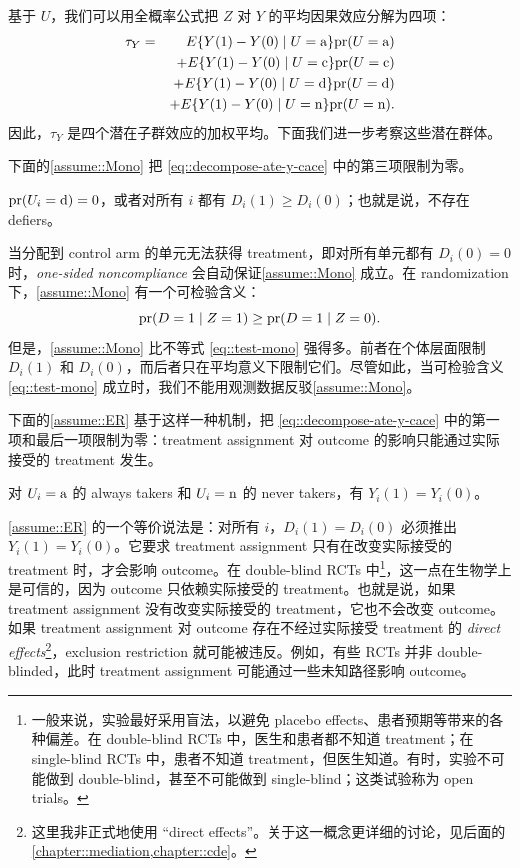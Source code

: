 基于 $U$，我们可以用全概率公式把 $Z$ 对 $Y$ 的平均因果效应分解为四项：
\begin{eqnarray} 
\tau_Y &=& E\{ Y(1) - Y(0) \mid U=\textup{a}  \} \textup{pr}(U = \textup{a} )  \nonumber  \\
&&+ E\{ Y(1) - Y(0) \mid U=\textup{c}   \} \textup{pr}(U = \textup{c} ) \nonumber  \\
&&+ E\{ Y(1) - Y(0) \mid U=\textup{d}  \} \textup{pr}(U = \textup{d} ) \nonumber  \\
&&+ E\{ Y(1) - Y(0) \mid U=\textup{n}  \} \textup{pr}(U = \textup{n} ) . \label{eq::decompose-ate-y-cace}
\end{eqnarray}  
因此，$\tau_Y $ 是四个潜在子群效应的加权平均。下面我们进一步考察这些潜在群体。



下面的\cref{assume::Mono} 把 \cref{eq::decompose-ate-y-cace} 中的第三项限制为零。
\begin{assumption}[monotonicity]
\label{assume::Mono}
$\textup{pr}(U_i = \textup{d}) = 0$，或者对所有 $i$ 都有 $D_i(1)\geq D_i(0)$；也就是说，不存在 defiers。
\end{assumption}

当分配到 control arm 的单元无法获得 treatment，即对所有单元都有 $D_i(0) = 0$ 时，{\it one-sided noncompliance} 会自动保证\cref{assume::Mono} 成立。在 randomization 下，\cref{assume::Mono} 有一个可检验含义：
\begin{equation}
\label{eq::test-mono}
\textup{pr}(D=1\mid Z=1) \geq \textup{pr}(D=1\mid Z=0).
\end{equation}
但是，\cref{assume::Mono} 比不等式 \cref{eq::test-mono} 强得多。前者在个体层面限制 $D_i(1)$ 和 $D_i(0)$，而后者只在平均意义下限制它们。尽管如此，当可检验含义 \cref{eq::test-mono} 成立时，我们不能用观测数据反驳\cref{assume::Mono}。


下面的\cref{assume::ER} 基于这样一种机制，把 \cref{eq::decompose-ate-y-cace} 中的第一项和最后一项限制为零：treatment assignment 对 outcome 的影响只能通过实际接受的 treatment 发生。
\begin{assumption}
\label{assume::ER}
对 $U_i=\textup{a}$ 的 always takers 和 $U_i = \textup{n}$ 的 never takers，有 $Y_i(1) = Y_i(0)$。
\end{assumption}


\cref{assume::ER} 的一个等价说法是：对所有 $i$，$D_i(1) =  D_i(0)$ 必须推出 $Y_i(1) =  Y_i(0)$。它要求 treatment assignment 只有在改变实际接受的 treatment 时，才会影响 outcome。在 double-blind RCTs 中\footnote{一般来说，实验最好采用盲法，以避免 placebo effects、患者预期等带来的各种偏差。在 double-blind RCTs 中，医生和患者都不知道 treatment；在 single-blind RCTs 中，患者不知道 treatment，但医生知道。有时，实验不可能做到 double-blind，甚至不可能做到 single-blind；这类试验称为 open trials。}，这一点在生物学上是可信的，因为 outcome 只依赖实际接受的 treatment。也就是说，如果 treatment assignment 没有改变实际接受的 treatment，它也不会改变 outcome。如果 treatment assignment 对 outcome 存在不经过实际接受 treatment 的 {\it direct effects}\footnote{这里我非正式地使用 ``direct effects''。关于这一概念更详细的讨论，见后面的\cref{chapter::mediation,chapter::cde}。}，exclusion restriction 就可能被违反。例如，有些 RCTs 并非 double-blinded，此时 treatment assignment 可能通过一些未知路径影响 outcome。





